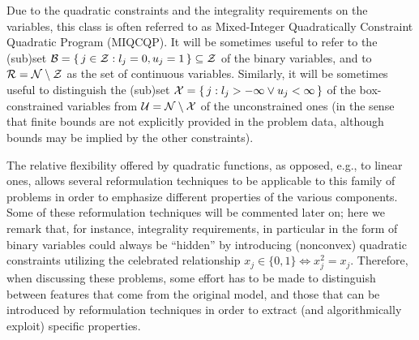 %
Due to the quadratic constraints and the integrality requirements on the variables, this class is often referred to as Mixed-Integer Quadratically Constraint Quadratic Program (MIQCQP). It will be sometimes useful to refer to the (sub)set $\mathcal{B} =  \{ \, j \in \mathcal{Z} : l_j = 0 , u_j = 1 \, \} \subseteq \mathcal{Z}$ of the binary variables, and to $\mathcal{R} = \mathcal{N} \setminus \mathcal{Z}$ as the set of continuous variables. Similarly, it will be sometimes useful to distinguish the (sub)set $\mathcal{X} = \{ \, j : l_j > -\infty \lor u_j < \infty \, \}$ of the box-constrained variables from $\mathcal{U} = \mathcal{N} \setminus \mathcal{X}$ of the unconstrained ones (in the sense that finite bounds are not explicitly provided in the problem data, although bounds may be implied by the other constraints).

The relative flexibility offered by quadratic functions, as opposed, e.g., to linear ones, allows several reformulation techniques to be applicable to this family of problems in order to emphasize different properties of the various components. Some of these reformulation techniques will be commented later on; here we remark that, for instance, integrality requirements, in particular in the form of binary variables could always be ``hidden'' by introducing (nonconvex) quadratic constraints utilizing the celebrated relationship $x_j \in \{0, 1\} \iff x_j^2 = x_j$. Therefore, when discussing these problems, some effort has to be made to distinguish between features that come from the original model, and those that can be introduced by reformulation techniques in order to extract (and algorithmically exploit) specific properties.




